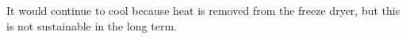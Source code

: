 It would continue to cool because heat is removed from the freeze dryer, but this is not sustainable in the long term.